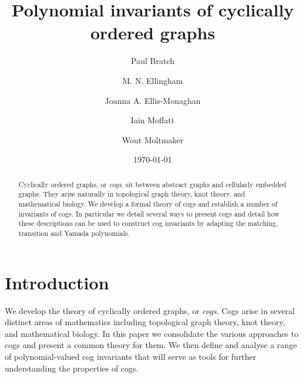 \documentclass{amsart}
\theoremstyle{definition}
\theoremstyle{remark}
\numberwithin{equation}{section}
\begin{document}
\title{Polynomial invariants of cyclically ordered graphs}


\author{Paul Bratch}
\address{Department of Mathematics, Royal Holloway, University of London, Egham, TW20~0EX, United Kingdom}

\author{M. N. Ellingham}
\address{Department of Mathematics, 1326 Stevenson Center, Vanderbilt University, Nashville, Tennessee 37240, U.S.A.}

\author{Joanna A. Ellis-Monaghan}
\address{Korteweg de Vries Institute for Mathematics, University of Amsterdam, 1098 XH Amsterdam, The Netherlands}

\author{Iain Moffatt}
\address{Department of Mathematics, Royal Holloway, University of London, Egham, TW20~0EX, United Kingdom}

\author{Wout Moltmaker}
\address{Korteweg de Vries Institute for Mathematics, University of Amsterdam, 1098 XH Amsterdam, The Netherlands}





\date{\today}


\begin{abstract}
 Cyclically ordered graphs, or \emph{cogs}, sit between abstract graphs and  cellularly embedded graphs.    They arise naturally in topological graph theory, knot theory, and mathematical biology. 
We develop  a formal theory of cogs and establish a number of  invariants of cogs. In particular we detail several ways to present cogs and detail how these descriptions can be used to construct cog invariants by adapting  the matching, transition and Yamada polynomials.
\end{abstract}


\maketitle




\section{Introduction}
We develop the theory of cyclically ordered graphs, or \emph{cogs}. 
Cogs arise in several distinct areas of mathematics including topological graph theory, knot theory, and mathematical biology. In this paper we consolidate the various approaches to cogs and present a common theory for them. We then define and analyse a range of polynomial-valued cog invariants that will serve as tools for further understanding the properties of cogs. 
\end{document}
